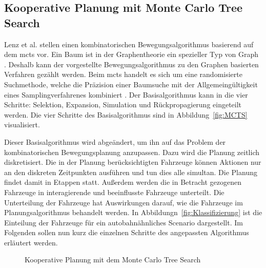 \subsection{Kooperative Planung mit Monte Carlo Tree Search}
Lenz et al. \cite{Lenz2016} stellen einen kombinatorischen Bewegungsalgorithmus basierend auf dem \gls{mcts} vor. 
Ein Baum ist in der Graphentheorie ein spezieller Typ von Graph \cite{Grimme2018}. 
Deshalb kann der vorgestellte Bewegungsalgorithmus zu den Graphen basierten Verfahren gez\"ahlt werden. 
Beim \gls{mcts} handelt es sich um eine randomisierte Suchmethode, welche die Pr\"azision einer Baumsuche mit der Allgemeing\"ultigkeit eines Samplingverfahrenes kombiniert \cite{Browne2012}. 
Der Basisalgorithmus kann in die vier Schritte: Selektion, Expansion, Simulation und R\"uckpropagierung eingeteilt werden. 
Die vier Schritte des Basisalgorithmus sind in Abbildung~\ref{fig:MCTS} visualisiert.

Dieser Basisalgorithmus wird abge\"andert, um ihn auf das Problem der kombinatorischen Bewegungsplanung anzupassen.  
Dazu wird die Planung zeitlich diskretisiert. 
Die in der Planung ber\"ucksichtigten Fahrzeuge k\"onnen Aktionen nur an den diskreten Zeitpunkten ausf\"uhren und tun dies alle simultan. 
Die Planung findet damit in Etappen statt. 
Au{\ss}erdem werden die in Betracht gezogenen Fahrzeuge in interagierende und beeinflusste Fahrzeuge unterteilt.
Die Unterteilung der Fahrzeuge hat Auswirkungen darauf, wie die Fahrzeuge im Planungsalgorithmus behandelt werden.
In Abbildungn~\ref{fig:Klassifizierung} ist die Einteilung der Fahrzeuge f\"ur ein autobahn\"ahnliches Scenario dargestellt.
Im Folgenden sollen nun kurz die einzelnen Schritte des angepassten Algorithmus erl\"autert werden.

\begin{figure}[!htbp]
    \centering
    \hfill
    \caption[Monte Carlo Tree Search]{Kooperative Planung mit dem Monte Carlo Tree Search}
    \label{fig:koopMCTS}
\end{figure}


